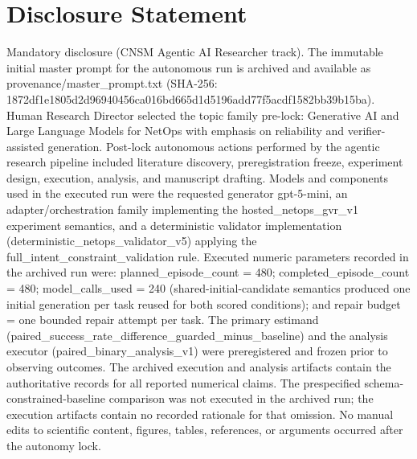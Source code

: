 \documentclass[conference]{IEEEtran}
\begin{document}
\section*{Disclosure Statement}
Mandatory disclosure (CNSM Agentic AI Researcher track). The immutable initial master prompt for the autonomous run is archived and available as provenance/master\_prompt.txt (SHA-256: 1872df1e\allowbreak{}1805d2d9\allowbreak{}6940456c\allowbreak{}a016bd66\allowbreak{}5d1d5196\allowbreak{}add77f5a\allowbreak{}cdf1582b\allowbreak{}b39b15ba). Human Research Director selected the topic family pre-lock: Generative AI and Large Language Models for NetOps with emphasis on reliability and verifier-assisted generation. Post-lock autonomous actions performed by the agentic research pipeline included literature discovery, preregistration freeze, experiment design, execution, analysis, and manuscript drafting. Models and components used in the executed run were the requested generator gpt-5-mini, an adapter/orchestration family implementing the hosted\_netops\_gvr\_v1 experiment semantics, and a deterministic validator implementation (deterministic\_netops\_validator\_v5) applying the full\_intent\_constraint\_validation rule. Executed numeric parameters recorded in the archived run were: planned\_episode\_count = 480; completed\_episode\_count = 480; model\_calls\_used = 240 (shared-initial-candidate semantics produced one initial generation per task reused for both scored conditions); and repair budget = one bounded repair attempt per task. The primary estimand (paired\_success\_rate\_difference\_guarded\_minus\_baseline) and the analysis executor (paired\_binary\_analysis\_v1) were preregistered and frozen prior to observing outcomes. The archived execution and analysis artifacts contain the authoritative records for all reported numerical claims. The prespecified schema-constrained-baseline comparison was not executed in the archived run; the execution artifacts contain no recorded rationale for that omission. No manual edits to scientific content, figures, tables, references, or arguments occurred after the autonomy lock.
\end{document}

